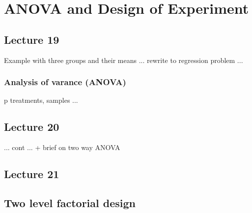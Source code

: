 \section{ANOVA and Design of Experiment}
\subsection*{Lecture 19}

Example with three groups and their means ... rewrite to regression problem ...


 

\subsubsection*{Analysis of varance (ANOVA)}
p treatments, samples ...

 


\subsection*{Lecture  20}


... cont ... + brief on two way ANOVA

\subsection*{Lecture  21}
\subsection{Two level factorial design}

